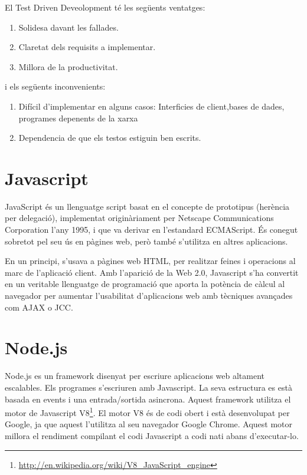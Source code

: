 El Test Driven Deveolopment té les següents ventatges: 

\begin{enumerate}
    \item{Solidesa davant les fallades.}
    \item{Claretat dels requisits a implementar.}
    \item{Millora de la productivitat.}
\end{enumerate}

i els següents inconvenients: 

\begin{enumerate}
    \item{Difícil d'implementar en alguns casos: Interficies de client,bases de dades, programes depenents de la xarxa }
    \item{Dependencia de que els testos estiguin ben escrits. }
    
\end{enumerate}



\section{Javascript}

JavaScript és un llenguatge script basat en el concepte de prototipus (herència per delegació), implementat originàriament per Netscape Communications Corporation l'any 1995, i que va derivar en l'estandard ECMAScript. És conegut sobretot pel seu ús en pàgines web, però també s'utilitza en altres aplicacions.

En un principi, s'usava a pàgines web HTML, per realitzar feines i operacions al marc de l'aplicació client. Amb l'aparició de la Web 2.0, Javascript s'ha convertit en un veritable llenguatge de programació que aporta la potència de càlcul al navegador per aumentar l'usabilitat d'aplicacions web amb tècniques avançades com AJAX o JCC.


\section{Node.js}

Node.js es un framework disenyat per escriure aplicacions web altament escalables. Els programes s'escriuren amb Javascript. La seva estructura es està basada en events i una entrada/sortida asincrona. Aquest framework utilitza el motor de Javascript V8\footnote{\url{http://en.wikipedia.org/wiki/V8_JavaScript_engine}}. El motor V8 és de codi obert i està desenvolupat per Google, ja que aquest l'utilitza al seu navegador Google Chrome. Aquest motor millora el rendiment compilant el codi Javascript a codi nati abans d'executar-lo.


